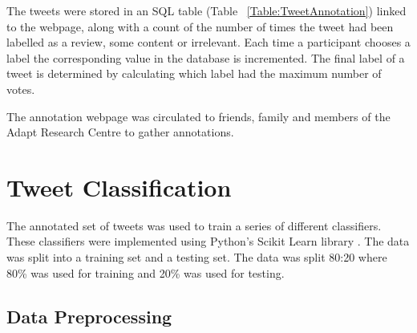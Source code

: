 The tweets were stored in an SQL table (Table ~\ref{Table:TweetAnnotation}) linked to the webpage, along with a count of the number of times the tweet had been labelled as a review, some content or irrelevant. Each time a participant chooses a label the corresponding value in the database is incremented. The final label of a tweet is determined by calculating which label had the maximum number of votes. 



The annotation webpage was circulated to friends, family and members of the Adapt Research Centre to gather annotations.

\section{Tweet Classification}

The annotated set of tweets was used to train a series of different classifiers. These classifiers were implemented using Python's Scikit Learn library \cite{scikit-learn}. The data was split into a training set and a testing set. The data was split 80:20 where 80\% was used for training and 20\% was used for testing.

\subsection*{Data Preprocessing}

